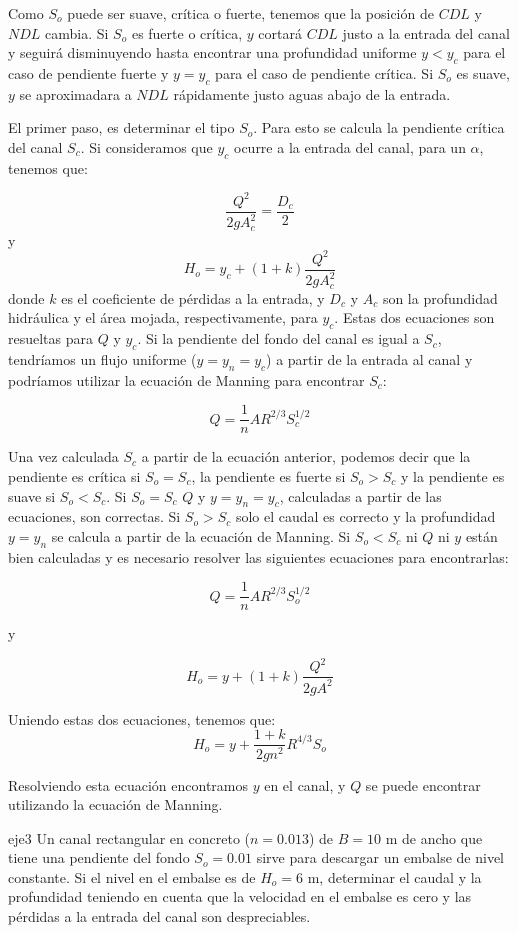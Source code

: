 \documentclass[11pt, oneside]{article}
\begin{document}
Como  $S_o$ puede ser suave, cr\'itica o fuerte, tenemos que la posici\'on de $CDL$ y $NDL$ cambia. Si $S_o$ es fuerte o cr\'itica, $y$ cortar\'a  $CDL$ justo a la entrada del canal y seguir\'a disminuyendo hasta encontrar una profundidad uniforme $y<y_c$ para el caso de pendiente fuerte y $y = y_c$ para el caso de pendiente cr\'itica. Si $S_o$ es suave, $y$ se aproximadara a $NDL$ r\'apidamente justo aguas abajo de la entrada.

El primer paso, es determinar el tipo $S_o$. Para esto se calcula la pendiente cr\'itica del canal $S_c$. Si consideramos que $y_c$ ocurre a la entrada del canal, para un $\alpha$, tenemos que:

$$
\frac{Q^2}{2g A_c^2} = \frac{D_c}{2}
$$
y 
$$
H_o = y_c + (1 + k) \frac{Q^2}{2g A_c^2}
$$
donde $k$ es el coeficiente de p\'erdidas a la entrada, y $D_c$ y $A_c$ son la profundidad hidr\'aulica y el \'area mojada, respectivamente, para $y_c$. Estas dos ecuaciones son resueltas para $Q$ y $y_c$. Si la pendiente del fondo del canal es igual a $S_c$, tendr\'iamos un flujo uniforme ($y = y_n = y_c$) a partir de la entrada al canal y podr\'iamos utilizar la ecuaci\'on de Manning para encontrar $S_c$:

$$
Q = \frac{1}{n}A R^{2/3} S_c^{1/2}
$$

Una vez calculada $S_c$ a partir de la ecuaci\'on anterior, podemos decir que la pendiente es cr\'itica si $S_o = S_c$, la pendiente es fuerte si $S_o > S_c$ y la pendiente es suave si $S_o < S_c$. Si $S_o = S_c$ $Q$ y $y = y_n = y_c$, calculadas a partir de las ecuaciones, son correctas. Si $S_o > S_c$ solo el caudal es correcto y la profundidad $y = y_n$ se calcula a partir de la ecuaci\'on de Manning. Si $S_o < S_c$ ni $Q$ ni $y$ est\'an bien calculadas y es necesario resolver las siguientes ecuaciones para encontrarlas:

$$
Q = \frac{1}{n}A R^{2/3} S_o^{1/2}
$$

y 

$$
H_o = y + (1 + k) \frac{Q^2}{2gA^2}
$$

Uniendo estas dos ecuaciones, tenemos que:
$$
H_o = y + \frac{1 + k}{2g n^2} R^{4/3} S_o
$$

Resolviendo esta ecuaci\'on encontramos $y$ en el canal, y $Q$ se puede encontrar utilizando la ecuaci\'on de Manning. 

\begin{eje}{}{eje3}
Un canal rectangular en concreto ($n = 0.013$) de $B = 10$ m de ancho que tiene una pendiente del fondo $S_o = 0.01$ sirve para descargar un embalse de nivel constante. Si el nivel en el embalse es de $H_o = 6$ m, determinar el caudal y la profundidad teniendo en cuenta que la velocidad en el embalse es cero y las p\'erdidas a la entrada del canal son despreciables.      
\end{eje}
\end{document}
